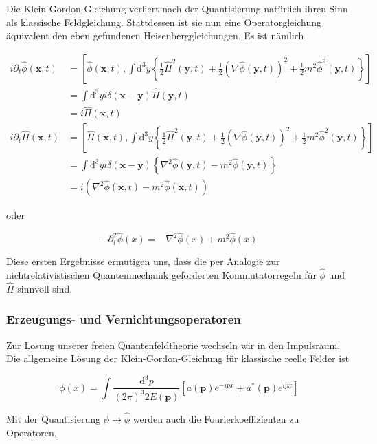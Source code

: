 \documentclass[10pt, letterpaper]{article}
\begin{document}
Die Klein-Gordon-Gleichung verliert nach der Quantisierung natürlich ihren Sinn als klassische Feldgleichung. Stattdessen ist sie nun eine Operatorgleichung äquivalent den eben gefundenen Heisenberggleichungen. Es ist nämlich

$$
\begin{aligned}
i \partial_{t} \hat{\phi}(\mathbf{x}, t) & =\left[\hat{\phi}(\mathbf{x}, t), \int \mathrm{d}^{3} y\left\{\frac{1}{2} \hat{\Pi}^{2}(\mathbf{y}, t)+\frac{1}{2}(\nabla \hat{\phi}(\mathbf{y}, t))^{2}+\frac{1}{2} m^{2} \hat{\phi}^{2}(\mathbf{y}, t)\right\}\right] \\
& =\int \mathrm{d}^{3} y i \delta(\mathbf{x}-\mathbf{y}) \hat{\Pi}(\mathbf{y}, t) \\
& =i \hat{\Pi}(\mathbf{x}, t) \\
i \partial_{t} \hat{\Pi}(\mathbf{x}, t) & =\left[\hat{\Pi}(\mathbf{x}, t), \int \mathrm{d}^{3} y\left\{\frac{1}{2} \hat{\Pi}^{2}(\mathbf{y}, t)+\frac{1}{2}(\nabla \hat{\phi}(\mathbf{y}, t))^{2}+\frac{1}{2} m^{2} \hat{\phi}^{2}(\mathbf{y}, t)\right\}\right] \\
& =\int \mathrm{d}^{3} y i \delta(\mathbf{x}-\mathbf{y})\left\{\nabla^{2} \hat{\phi}(\mathbf{y}, t)-m^{2} \hat{\phi}(\mathbf{y}, t)\right\} \\
& =i\left(\nabla^{2} \hat{\phi}(\mathbf{x}, t)-m^{2} \hat{\phi}(\mathbf{x}, t)\right)
\end{aligned}
$$

oder

$$
-\partial_{t}^{2} \hat{\phi}(x)=-\nabla^{2} \hat{\phi}(x)+m^{2} \hat{\phi}(x)
$$

Diese ersten Ergebnisse ermutigen uns, dass die per Analogie zur nichtrelativistischen Quantenmechanik geforderten Kommutatorregeln für $\hat{\phi}$ und $\hat{\Pi}$ sinnvoll sind.

\subsubsection*{Erzeugungs- und Vernichtungsoperatoren}
Zur Lösung unserer freien Quantenfeldtheorie wechseln wir in den Impulsraum. Die allgemeine Lösung der Klein-Gordon-Gleichung für klassische reelle Felder ist

$$
\phi(x)=\int \frac{\mathrm{d}^{3} p}{(2 \pi)^{3} 2 E(\mathbf{p})}\left[a(\mathbf{p}) e^{-i p x}+a^{*}(\mathbf{p}) e^{i p x}\right]
$$

Mit der Quantisierung $\phi \rightarrow \hat{\phi}$ werden auch die Fourierkoeffizienten zu Operatoren,
\end{document}
